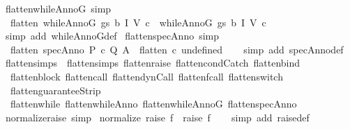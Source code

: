 \begin{isabellebody}
\endisatagproof
{\isafoldproof}%
%
\isadelimproof
\isanewline
%
\endisadelimproof
\isanewline
{}\isamarkupfalse%
\ flatten{\isacharunderscore}whileAnnoG\ {\isacharbrackleft}simp{\isacharbrackright}{\isacharcolon}\ \isanewline
\ \ {\isachardoublequoteopen}flatten\ {\isacharparenleft}whileAnnoG\ gs\ b\ I\ V\ c{\isacharparenright}\ {\isacharequal}\ {\isacharbrackleft}whileAnnoG\ gs\ b\ I\ V\ c{\isacharbrackright}{\isachardoublequoteclose}\isanewline
%
\isadelimproof
\ \ %
\endisadelimproof
%
\isatagproof
{}\isamarkupfalse%
\ {\isacharparenleft}simp\ add{\isacharcolon}\ whileAnnoG{\isacharunderscore}def{\isacharparenright}%
\endisatagproof
{\isafoldproof}%
%
\isadelimproof
\isanewline
%
\endisadelimproof
\isanewline
{}\isamarkupfalse%
\ flatten{\isacharunderscore}specAnno\ {\isacharbrackleft}simp{\isacharbrackright}{\isacharcolon}\isanewline
\ \ {\isachardoublequoteopen}flatten\ {\isacharparenleft}specAnno\ P\ c\ Q\ A{\isacharparenright}\ {\isacharequal}\ flatten\ {\isacharparenleft}c\ undefined{\isacharparenright}{\isachardoublequoteclose}\isanewline
%
\isadelimproof
\ \ %
\endisadelimproof
%
\isatagproof
{}\isamarkupfalse%
\ {\isacharparenleft}simp\ add{\isacharcolon}\ specAnno{\isacharunderscore}def{\isacharparenright}%
\endisatagproof
{\isafoldproof}%
%
\isadelimproof
\isanewline
%
\endisadelimproof
\isanewline
{}\isamarkupfalse%
\ flatten{\isacharunderscore}simps\ {\isacharequal}\ flatten{\isachardot}simps\ flatten{\isacharunderscore}raise\ flatten{\isacharunderscore}condCatch\ flatten{\isacharunderscore}bind\isanewline
\ \ flatten{\isacharunderscore}block\ flatten{\isacharunderscore}call\ flatten{\isacharunderscore}dynCall\ flatten{\isacharunderscore}fcall\ flatten{\isacharunderscore}switch\isanewline
\ \ flatten{\isacharunderscore}guaranteeStrip\isanewline
\ \ flatten{\isacharunderscore}while\ flatten{\isacharunderscore}whileAnno\ flatten{\isacharunderscore}whileAnnoG\ flatten{\isacharunderscore}specAnno\isanewline
\isanewline
{}\isamarkupfalse%
\ normalize{\isacharunderscore}raise\ {\isacharbrackleft}simp{\isacharbrackright}{\isacharcolon}\isanewline
\ {\isachardoublequoteopen}normalize\ {\isacharparenleft}raise\ f{\isacharparenright}\ {\isacharequal}\ raise\ f{\isachardoublequoteclose}\isanewline
%
\isadelimproof
\ \ %
\endisadelimproof
%
\isatagproof
{}\isamarkupfalse%
\ {\isacharparenleft}simp\ add{\isacharcolon}\ raise{\isacharunderscore}def{\isacharparenright}%
\endisatagproof
{\isafoldproof}%
%
\isadelimproof
\isanewline
%
\endisadelimproof
\isanewline

\end{isabellebody}
